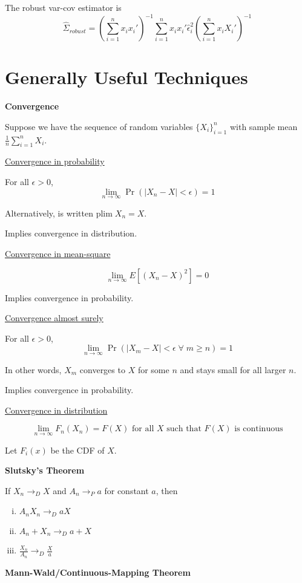 \documentclass[16pt]{article}
\newcommand{\plim}{\text{plim}\; }
\begin{document}
The robust var-cov estimator is $$\hat{\Sigma}_{robust} = (\sum_{i=1}^n x_i x_i')^{-1} \sum_{i=1}^n x_i x_i' \hat{\epsilon}_i^2(\sum_{i=1}^n x_i X_i')^{-1}$$

\section*{Generally Useful Techniques}

\textbf{Convergence}

Suppose we have the sequence of random variables $\{ X_i \}_{i=1}^n$ with sample mean $\frac{1}{n} \sum_{i=1}^n X_i$.

\underline{Convergence in probability}

For all $\epsilon > 0$, $$\lim_{n \to \infty} \Pr(\mid X_n - X \mid < \epsilon) = 1$$

Alternatively, is written $\plim X_n = X$.

Implies convergence in distribution.

\underline{Convergence in mean-square}

$$\lim_{n \to \infty} E[(X_n - X)^2] = 0$$

Implies convergence in probability.

\underline{Convergence almost surely}

For all $\epsilon > 0$, $$\lim_{n\to\infty} \Pr(\mid X_m - X\mid < \epsilon\;\forall\; m \geq n) = 1$$

In other words, $X_m$ converges to $X$ for some $n$ and stays small for all larger $n$.

Implies convergence in probability.

\underline{Convergence in distribution}

$$\lim_{n\to\infty} F_n(X_n) = F(X) \text{ for all $X$ such that $F(X)$ is continuous}$$ 

Let $F_i(x)$ be the CDF of $X$.

\textbf{Slutsky's Theorem}

If $X_n \to_D X$ and $A_n \to_P a$ for constant $a$, then

\begin{enumerate}[(i)]
  \item $A_n X_n \to_D aX$
  \item $A_n + X_n \to_D a + X$
  \item $\frac{X_n}{A_n} \to_D \frac{X}{a}$
\end{enumerate}

\textbf{Mann-Wald/Continuous-Mapping Theorem}
\end{document}
